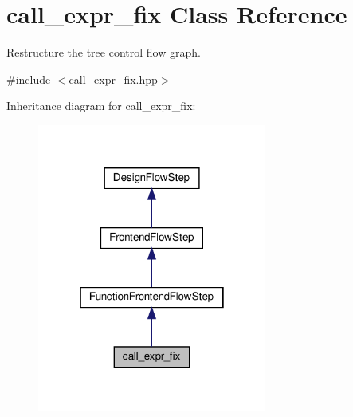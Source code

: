 \hypertarget{classcall__expr__fix}{}\section{call\+\_\+expr\+\_\+fix Class Reference}
\label{classcall__expr__fix}


Restructure the tree control flow graph.  




{\ttfamily \#include $<$call\+\_\+expr\+\_\+fix.\+hpp$>$}



Inheritance diagram for call\+\_\+expr\+\_\+fix\+:
\nopagebreak
\begin{figure}[H]
\begin{center}
\leavevmode
\includegraphics[width=214pt]{dd/da4/classcall__expr__fix__inherit__graph}
\end{center}
\end{figure}


